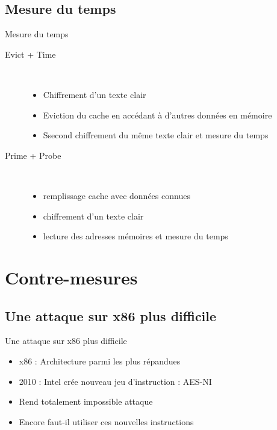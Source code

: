 \documentclass[11pt]{beamer}
\begin{document}
\subsection{Mesure du temps}
\begin{frame}{Mesure du temps~\cite{osvik2006cache}}

\begin{description}
\item [Evict + Time]  ~\\
\begin{itemize}
\item Chiffrement d'un texte clair
\item Eviction du cache en accédant à d'autres données en mémoire
\item Ssecond chiffrement du même texte clair et mesure du temps
\end{itemize}
\item [Prime + Probe]  ~\\
\begin{itemize}
\item remplissage cache avec données connues
\item chiffrement d'un texte clair
\item lecture des adresses mémoires et mesure du temps
\end{itemize}
\end{description}
\end{frame}

\section{Contre-mesures}

\subsection{Une attaque sur x86 plus difficile}
\begin{frame}{Une attaque sur x86 plus difficile}
	\begin{itemize}
		\item x86 : Architecture parmi les plus répandues
		\item 2010 : Intel crée nouveau jeu d'instruction : AES-NI
		\item Rend totalement impossible attaque
		\item Encore faut-il utiliser ces nouvelles instructions
	\end{itemize}
\end{frame}
\end{document}
